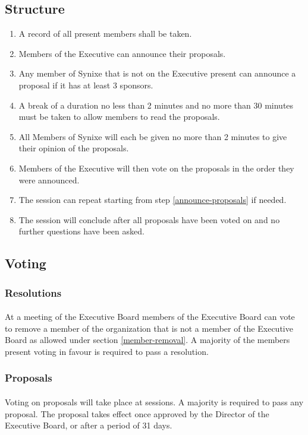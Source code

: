 \documentclass[10pt,a4paper]{article}
\begin{document}
\subsection{Structure}
\begin{enumerate}
	\item A record of all present members shall be taken.
	\item\label{announce-proposals} Members of the Executive can announce their proposals.
	\item Any member of Synixe that is not on the Executive present can announce a proposal if it has at least 3 sponsors.
	\item A break of a duration no less than 2 minutes and no more than 30 minutes must be taken to allow members to read the proposals.
	\item All Members of Synixe will each be given no more than 2 minutes to give their opinion of the proposals.
	\item Members of the Executive will then vote on the proposals in the order they were announced.
	\item The session can repeat starting from step \ref{announce-proposals} if needed.
	\item The session will conclude after all proposals have been voted on and no further questions have been asked.
\end{enumerate}
\subsection{Voting}
\subsubsection{Resolutions}
\paragraph{}
At a meeting of the Executive Board members of the Executive Board can vote to remove a member of the organization that is not a member of the Executive Board as allowed under section \ref{member-removal}. A majority of the members present voting in favour is required to pass a resolution.
\subsubsection{Proposals}
\paragraph{}
Voting on proposals will take place at sessions. A majority is required to pass any proposal. The proposal takes effect once approved by the Director of the Executive Board, or after a period of 31 days.
\end{document}
